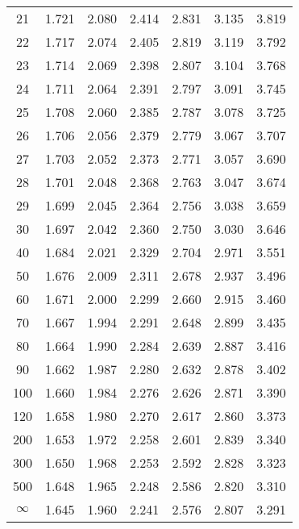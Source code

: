 \documentclass[12pt]{article}
\begin{document}
\begin{table}
\begin{center}
{\begin{tabular}{|c|c|c|c|c|c|c|}
	21 &1.721 &  2.080 &  2.414& 2.831&3.135& 3.819\\
	22 & 1.717 &  2.074 &  2.405 &  2.819 &  3.119 &  3.792\\
	23&  1.714 &  2.069 &  2.398 &  2.807 &  3.104 &  3.768\\
	24 & 1.711 &2.064 &2.391 &  2.797&   3.091&   3.745 \\
	25 & 1.708 &  2.060 &  2.385& 2.787 &3.078 &3.725 \\
	26 & 1.706 &  2.056 &  2.379 &  2.779 &  3.067 &3.707\\
	27 &1.703 &2.052 &2.373  & 2.771 &  3.057 &  3.690 \\
	28  &1.701& 2.048 &2.368 &  2.763 &3.047& 3.674 \\
	29 & 1.699 &  2.045 &  2.364 & 2.756 &3.038 &  3.659\\
	30 &1.697 &2.042 &2.360 &  2.750 &  3.030 &3.646 \\
	40 &1.684 &  2.021 &  2.329 &2.704 &2.971& 3.551\\
	50 & 1.676 &2.009 &2.311 &  2.678 &  2.937 &  3.496\\
	60 & 1.671& 2.000 &2.299 &2.660 &2.915 &  3.460\\
	70  &1.667 &  1.994  & 2.291 &  2.648 &  2.899 &  3.435\\
	80 & 1.664 &  1.990 &  2.284 &  2.639 &  2.887 &  3.416\\
	90&  1.662& 1.987 &2.280 &  2.632 &  2.878 &  3.402\\
	100& 1.660 &  1.984 &  2.276& 2.626 &2.871 &3.390\\
	120 &1.658 &  1.980 &  2.270 &  2.617 &  2.860 &3.373\\
	200 &1.653 &1.972 &  2.258 &  2.601 &  2.839 &  3.340\\
	300 &1.650 &1.968& 2.253& 2.592 &2.828 &  3.323\\
	500 &1.648 &  1.965 &  2.248 &2.586 &2.820 &  3.310\\ \hline
	$\infty$ &   1.645 &  1.960 &  2.241 &  2.576 &  2.807 & 3.291\\
	\hline
\end{tabular}
}
\end{center}
\end{table}

\end{document}

